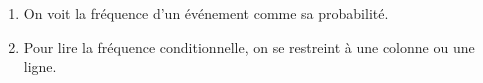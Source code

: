 \begin{methode*}{}{}
	\begin{enumerate}[label=$\bullet$]
		\item On voit la fréquence d'un événement comme sa probabilité.
		\item Pour lire la fréquence conditionnelle, on se restreint à une colonne ou une ligne.
	\end{enumerate}
\end{methode*}


